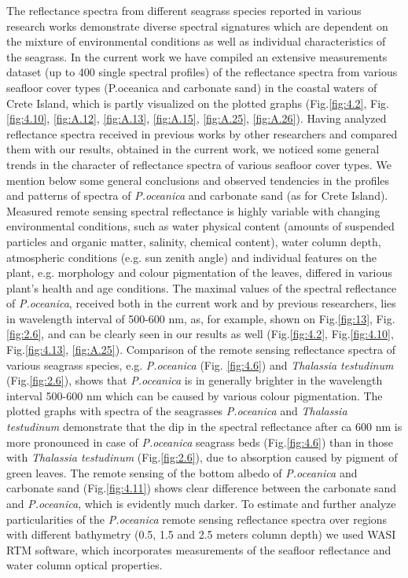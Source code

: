 \documentclass[11pt]{article}
\begin{document}
The reflectance spectra from different seagrass species reported in various research works demonstrate diverse spectral signatures which are dependent on the mixture of environmental conditions as well as individual characteristics of the seagrass. 
In the current work we have compiled an extensive measurements dataset (up to 400 single spectral profiles) of the reflectance spectra from various seafloor cover types (P.oceanica and carbonate sand) in the coastal waters of Crete Island, which is partly visualized on the plotted graphs (Fig.\ref{fig:4.2}, Fig.\ref{fig:4.10}, \ref{fig:A.12}, \ref{fig:A.13}, \ref{fig:A.15}, \ref{fig:A.25}, \ref{fig:A.26}).
Having analyzed reflectance spectra received in previous works by other researchers and compared them with our results, obtained in the current work, we noticed some general trends in the character of reflectance spectra of various seafloor cover types. We mention below some general conclusions and observed tendencies in the profiles and patterns of spectra of \textit{P.oceanica} and carbonate sand (as for Crete Island). 
Measured remote sensing spectral reflectance is highly variable with changing environmental conditions, such as water physical content (amounts of suspended particles and organic matter, salinity, chemical content), water column depth, atmospheric conditions (e.g. sun zenith angle) and individual features on the plant, e.g. morphology and colour pigmentation of the leaves, differed in various plant's health and age conditions. 
The maximal values of the spectral reflectance of \textit{P.oceanica}, received both in the current work and by previous researchers, lies in wavelength interval of 500-600 nm, as, for example, shown on Fig.\ref{fig:13}, Fig.\ref{fig:2.6}, and can be clearly seen in our results as well (Fig.\ref{fig:4.2}, Fig.\ref{fig:4.10}, Fig.\ref{fig:4.13}, \ref{fig:A.25}). Comparison of the remote sensing reflectance spectra of various seagrass species, e.g. \textit{P.oceanica} (Fig. \ref{fig:4.6}) and \textit{Thalassia testudinum}\label{page-21} (Fig.\ref{fig:2.6}), shows that \textit{P.oceanica} is in generally brighter in the wavelength interval 500-600 nm which can be caused by various colour pigmentation. The plotted graphs with spectra of the seagrasses \textit{P.oceanica} and \textit{Thalassia testudinum} demonstrate that the dip in the spectral reflectance after ca 600 nm is more pronounced in case of \textit{P.oceanica} seagrass beds (Fig.\ref{fig:4.6}) than in those with \textit{Thalassia testudinum} (Fig.\ref{fig:2.6}), due to absorption caused by pigment of green leaves. 
The remote sensing of the bottom albedo of \textit{P.oceanica} and carbonate sand (Fig.\ref{fig:4.11}) shows clear difference between the carbonate sand and \textit{P.oceanica}, which is evidently much darker.  To estimate and further analyze particularities of the \textit{P.oceanica} remote sensing reflectance spectra over regions with different bathymetry (0.5, 1.5 and 2.5 meters column depth) we used \ac{WASI} \ac{RTM} software, which incorporates measurements of the seafloor reflectance and water column optical properties.\label{page-22}
\end{document}
